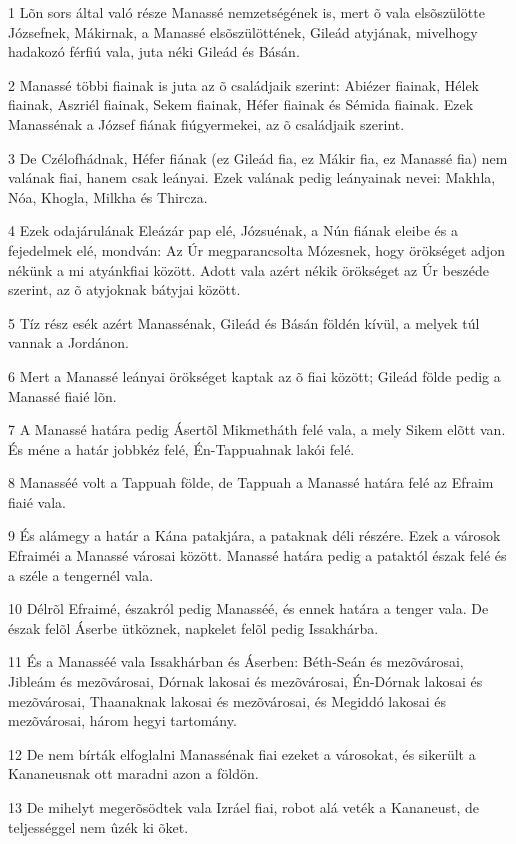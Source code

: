 \par 1 Lõn sors által való része Manassé nemzetségének is, mert õ vala elsõszülötte Józsefnek, Mákirnak, a Manassé  elsõszülöttének, Gileád atyjának, mivelhogy hadakozó férfiú vala, juta néki Gileád és Básán.
\par 2 Manassé többi fiainak is juta az õ családjaik szerint: Abiézer fiainak, Hélek fiainak, Aszriél fiainak, Sekem fiainak, Héfer fiainak és Sémida fiainak. Ezek Manassénak a József fiának fiúgyermekei, az õ családjaik szerint.
\par 3 De Czélofhádnak, Héfer fiának (ez Gileád fia, ez Mákir fia, ez Manassé fia) nem valának fiai, hanem csak leányai. Ezek valának pedig leányainak nevei: Makhla, Nóa, Khogla, Milkha és Thircza.
\par 4 Ezek odajárulának Eleázár pap elé, Józsuénak, a Nún fiának eleibe és a fejedelmek elé, mondván: Az Úr megparancsolta Mózesnek, hogy örökséget adjon nékünk a mi atyánkfiai között. Adott vala azért nékik örökséget az Úr beszéde szerint, az õ atyjoknak bátyjai között.
\par 5 Tíz rész esék azért Manassénak, Gileád és Básán földén kívül, a melyek túl vannak a Jordánon.
\par 6 Mert a Manassé leányai örökséget kaptak az õ fiai között; Gileád földe pedig a Manassé fiaié lõn.
\par 7 A Manassé határa pedig Ásertõl Mikmetháth felé vala, a mely Sikem elõtt van. És méne a határ jobbkéz felé, Én-Tappuahnak lakói felé.
\par 8 Manasséé volt a Tappuah földe, de Tappuah a Manassé határa felé az Efraim fiaié vala.
\par 9 És alámegy a határ a Kána patakjára, a pataknak déli részére. Ezek a városok Efraiméi a Manassé városai között. Manassé határa pedig a pataktól észak felé és a széle a tengernél vala.
\par 10 Délrõl Efraimé, északról pedig Manasséé, és ennek határa a tenger vala. De észak felõl Áserbe ütköznek, napkelet felõl pedig Issakhárba.
\par 11 És a Manasséé vala Issakhárban és Áserben: Béth-Seán és mezõvárosai, Jibleám és mezõvárosai, Dórnak  lakosai és mezõvárosai, Én-Dórnak lakosai és mezõvárosai, Thaanaknak lakosai és mezõvárosai, és Megiddó lakosai és mezõvárosai, három hegyi tartomány.
\par 12 De nem bírták elfoglalni Manassénak fiai ezeket a városokat, és sikerült a Kananeusnak ott maradni azon a földön.
\par 13 De mihelyt megerõsödtek vala Izráel fiai, robot alá veték a Kananeust, de teljességgel nem ûzék ki õket.

